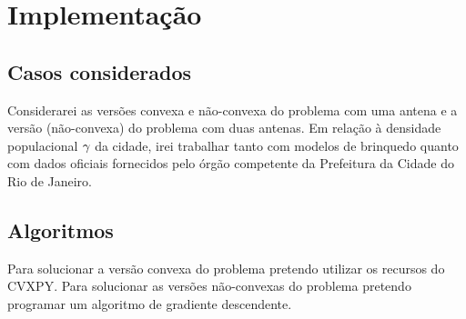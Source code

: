 \documentclass[a4paper,12pt]{article}
\begin{document}
\section{Implementação}

\subsection{Casos considerados}
Considerarei as versões convexa e não-convexa do problema com uma antena e a versão (não-convexa) do problema com duas antenas. Em relação à densidade populacional $\gamma$ da cidade, irei trabalhar tanto com modelos de brinquedo quanto com dados oficiais fornecidos pelo órgão competente da Prefeitura da Cidade do Rio de Janeiro.

\subsection{Algoritmos}

Para solucionar a versão convexa do problema pretendo utilizar os recursos do CVXPY. Para solucionar as versões não-convexas do problema pretendo programar um algoritmo de gradiente descendente.
\end{document}
